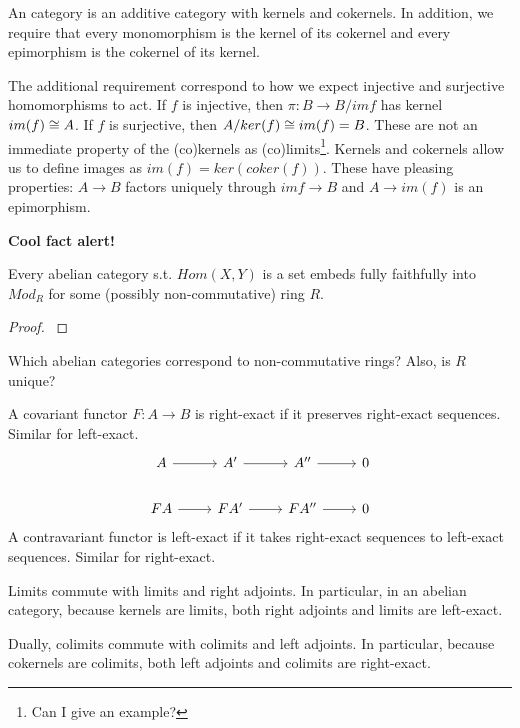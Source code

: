 \begin{definition}
An  category is an additive category with kernels and cokernels. In addition, we require that every monomorphism is the kernel of its cokernel and every epimorphism is the cokernel of its kernel.
\end{definition}
The additional requirement correspond to how we expect injective and surjective homomorphisms to act. If $f$ is injective, then $\pi:B\rightarrow B/im f$ has kernel $im(f)\cong A$. If $f$ is surjective, then $A/ker(f)\cong im(f)=B$. These are not an immediate property of the (co)kernels as (co)limits\footnote{Can I give an example?}. Kernels and cokernels allow us to define images as $im(f)=ker(coker(f))$. These have pleasing properties: $A\rightarrow B$ factors uniquely through $imf\rightarrow B$ and $A\rightarrow im(f)$ is an epimorphism.

\textbf{Cool fact alert!}
\begin{theorem}
Every abelian category s.t. $Hom(X,Y)$ is a set embeds fully faithfully into $Mod_R$ for some (possibly non-commutative) ring $R$.
\end{theorem}
\begin{proof}
\cite{Weibel}
\end{proof}
Which abelian categories correspond to non-commutative rings? Also, is $R$ unique?

\begin{definition}
A covariant functor $F:A\rightarrow B$ is right-exact if it preserves right-exact sequences. Similar for left-exact.
\[\begin{tikzcd}
A \arrow[r]  & A' \arrow[r]  & A'' \arrow[r]  & 0 \\
FA \arrow[r] & FA' \arrow[r] & FA'' \arrow[r] & 0
\end{tikzcd}\]
A contravariant functor is left-exact if it takes right-exact sequences to left-exact sequences. Similar for right-exact.
\end{definition}

\begin{lemma}
Limits commute with limits and right adjoints. In particular, in an abelian category,
because kernels are limits, both right adjoints and limits are left-exact.

Dually, colimits commute with colimits and left adjoints. In particular, because cokernels are
colimits, both left adjoints and colimits are right-exact.
\end{lemma}
